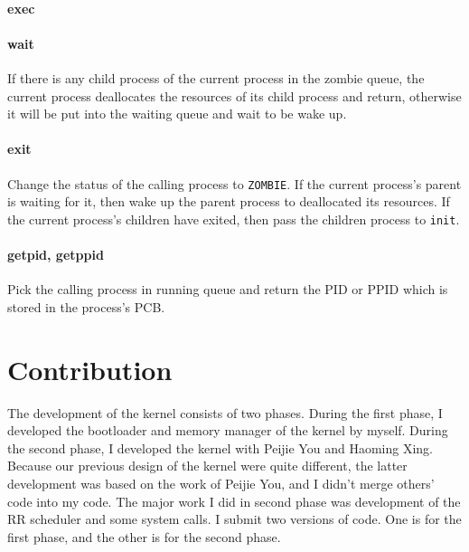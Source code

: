 \documentclass[12pt, a4paper]{article}
\begin{document}
\paragraph{exec}

\paragraph{wait}
If there is any child process of the current process in the zombie queue, the current process deallocates the resources of its child process and return, otherwise it will be put into the waiting queue and wait to be wake up.

\paragraph{exit}
Change the status of the calling process to \verb|ZOMBIE|. If the current process's parent is waiting for it, then wake up the parent process to deallocated its resources. If the current process's children have exited, then pass the children process to \verb|init|.

\paragraph{getpid, getppid}
Pick the calling process in running queue and return the PID or PPID which is stored in the process's PCB.

\section{Contribution}
The development of the kernel consists of two phases. During the first phase, I developed the bootloader and memory manager of the kernel  by myself. During the second phase, I developed the kernel with Peijie You and Haoming Xing. Because our previous design of the kernel were quite different, the latter development was based on the work of Peijie You, and I didn't merge others' code into my code. The major work I did in second phase was development of the RR scheduler and some system calls. I submit two versions of code. One is for the first phase, and the other is for the second phase.
\end{document}

